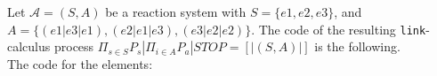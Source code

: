  \begin{example}
 Let  $\mathcal{A} =(S,A) $ be a reaction system with $S= \{e1,e2,e3\}$, and $A=\{(e1|e3|e1),(e2|e1|e3),(e3|e2|e2) \}$.
 The code of the resulting {\tt link}-calculus process $ \Pi_{s\in S} P_s | \Pi_{i\in A} P_a| STOP = [|(S,A) |] $ is the following. \\
 The code for the elements:\\


\end{example}
